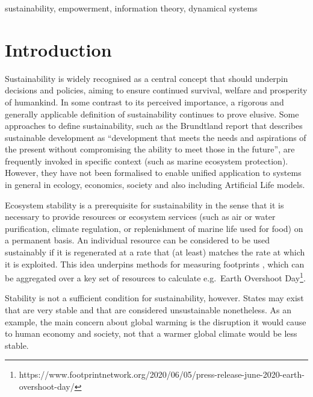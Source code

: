 \documentclass[conference]{IEEEtran}
\begin{document}
\begin{IEEEkeywords}
sustainability, empowerment, information theory, dynamical systems
\end{IEEEkeywords}


\section{Introduction}

Sustainability is widely recognised as a central concept that should
underpin decisions and policies, aiming to ensure continued survival,
welfare and prosperity of humankind. In some contrast to its perceived
importance, a rigorous and generally applicable definition of
sustainability continues to prove elusive. Some approaches to define
sustainability, such as the Brundtland report that describes
sustainable development as ``development that meets the needs and
aspirations of the present without compromising the ability to meet
those in the future''\cite{Brundlandcommission1987}, are frequently
invoked in specific context (such as marine ecosystem protection).
However, they have not been formalised to enable unified application
to systems in general in ecology, economics, society and also
including Artificial Life models.

Ecosystem stability is a prerequisite for sustainability in the sense
that it is necessary to provide resources or ecosystem services (such
as air or water purification, climate regulation, or replenishment of
marine life used for food) on a permanent basis. An individual
resource can be considered to be used sustainably if it is regenerated
at a rate that (at least) matches the rate at which it is exploited.
This idea underpins methods for measuring footprints
\cite{Wackernagel2019_defyingthefootprintoracle}, which can be
aggregated over a key set of resources to calculate e.g.\ Earth
Overshoot
Day\footnote{https://www.footprintnetwork.org/2020/06/05/press-release-june-2020-earth-overshoot-day/}.

Stability is not a sufficient condition for sustainability, however.
States may exist that are very stable and that are considered
unsustainable nonetheless. As an example, the main concern about
global warming is the disruption it would cause to human economy and
society, not that a warmer global climate would be less stable.
\end{document}
